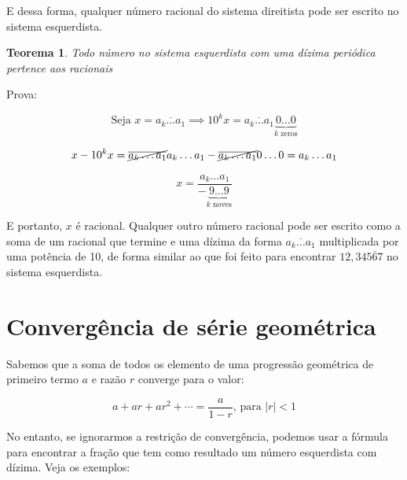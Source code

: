 \documentclass{report}
\newtheorem{theorem}{Teorema}
\theoremstyle{definition}
\begin{document}
E dessa forma, qualquer número racional do sistema direitista pode ser escrito no sistema esquerdista.

\begin{theorem}
    Todo número no sistema esquerdista com uma dízima periódica pertence aos racionais
\end{theorem}

Prova:

\begin{equation*}
    \text{Seja }x = \overline{a_{k} \ldots a_1} \implies 10^kx=\overline{a_{k} \ldots a_1}\underbrace{0 \ldots 0}_{k\text{ zeros}}
\end{equation*}

\begin{equation*}
    x - 10^k x = \cancel{\overline{a_{k} \ldots a_1}} a_{k} \ldots a_1 - \cancel{\overline{a_{k} \ldots a_1}} 0 \ldots 0 = a_{k} \ldots a_1
\end{equation*}

\begin{equation}
    x = \frac{a_{k} \ldots a_1}{-\underbrace{9 \ldots 9}_{k\text{ noves}}}
\end{equation}

E portanto, $x$ é racional. Qualquer outro número racional pode ser escrito como a soma de um racional que termine e uma dízima da forma $\overline{a_{k} \ldots a_1}$ multiplicada por uma potência de 10, de forma similar ao que foi feito para encontrar $12,34\overline{567}$ no sistema esquerdista.

\section{Convergência de série geométrica}

Sabemos que a soma de todos os elemento de uma progressão geométrica de primeiro termo $a$ e razão $r$ converge para o valor:

\begin{equation}
    a + ar + ar^2 + \cdots = \frac{a}{1-r} \text{, para } |r| < 1
\end{equation}

No entanto, se ignorarmos a restrição de convergência, podemos usar a fórmula para encontrar a fração que tem como resultado um número esquerdista com dízima. Veja os exemplos:

\bigskip

\end{document}
